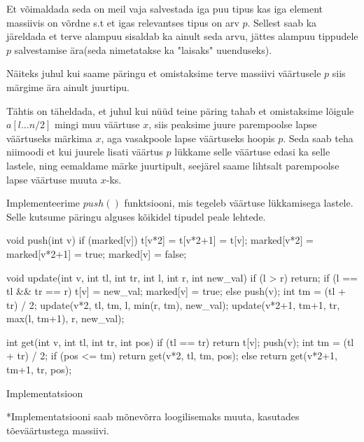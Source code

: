 \documentclass{trkut}
\begin{document}
Et võimaldada seda on meil vaja salvestada iga puu tipus kas iga element massiivis on võrdne s.t et igas relevantses tipus on arv $p$. Sellest saab ka järeldada et terve alampuu sisaldab ka ainult seda arvu, jättes alampuu tippudele $p$ salvestamise ära(seda nimetatakse ka "laisaks" uuenduseks). \parencite{EMaxx}

Näiteks juhul kui saame päringu et omistaksime terve massiivi väärtusele $p$ siis märgime ära ainult juurtipu.\parencite{EMaxx}

Tähtis on täheldada, et juhul kui nüüd teine päring tahab et omistaksime lõigule $a[l...n/2]$ mingi muu väärtuse $x$, siis peaksime juure parempoolse lapse väärtuseks märkima $x$, aga vasakpoole lapse väärtuseks hoopis $p$. Seda saab teha niimoodi et kui juurele lisati väärtus $p$ lükkame selle väärtuse edasi ka selle lastele, ning eemaldame märke juurtipult, seejärel saame lihtsalt parempoolse lapse väärtuse muuta $x$-ks. \parencite{EMaxx}

Implementeerime $push()$ funktsiooni, mis tegeleb väärtuse lükkamisega lastele. Selle kutsume päringu alguses kõikidel tipudel peale lehtede. \parencite{EMaxx}
\begin{cclol}
void push(int v) {
    if (marked[v]) {
        t[v*2] = t[v*2+1] = t[v];
        marked[v*2] = marked[v*2+1] = true;
        marked[v] = false;
    }
}

void update(int v, int tl, int tr, int l, int r, int new_val) {
    if (l > r) 
        return;
    if (l == tl && tr == r) {
        t[v] = new_val;
        marked[v] = true;
    } else {
        push(v);
        int tm = (tl + tr) / 2;
        update(v*2, tl, tm, l, min(r, tm), new_val);
        update(v*2+1, tm+1, tr, max(l, tm+1), r, new_val);
    }
}

int get(int v, int tl, int tr, int pos) {
    if (tl == tr) {
        return t[v];
    }
    push(v);
    int tm = (tl + tr) / 2;
    if (pos <= tm) 
        return get(v*2, tl, tm, pos);
    else
        return get(v*2+1, tm+1, tr, pos);
}
\end{cclol}
 \begin{kk}[H]%
    \caption{Implementatsioon}%
    \label{EMaxx}%
    \end{kk}
*Implementatsiooni saab mõnevõrra loogilisemaks muuta, kasutades tõeväärtustega massiivi.
\end{document}
